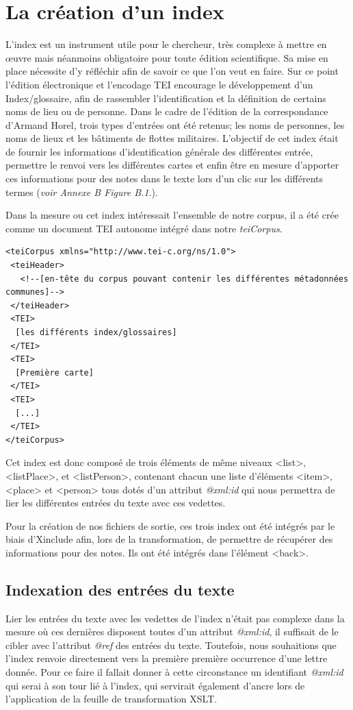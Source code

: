 \documentclass[12pt,a4paper]{book} %
\begin{document}
\section{La création d'un index}

L'index est un instrument utile pour le chercheur, très complexe à mettre en œuvre mais néanmoins obligatoire pour toute édition scientifique. Sa mise en place nécessite d'y réfléchir afin de savoir ce que l'on veut en faire. Sur ce point l'édition électronique et l'encodage TEI encourage le développement d'un Index/glossaire, afin de rassembler l'identification et la définition de certains noms de lieu ou de personne. Dans le cadre de l'édition de la correspondance d'Armand Horel, trois types d'entrées ont été retenus; les noms de personnes, les noms de lieux et les bâtiments de flottes militaires. L'objectif de cet index était de fournir les informations d'identification générale des différentes entrée, permettre le renvoi vers les différentes cartes et enfin être en mesure d'apporter ces informations pour des notes dans le texte lors d'un clic sur les différents termes (\textit{voir Annexe B Figure B.1}.).


Dans la mesure ou cet index intéressait l'ensemble de notre corpus, il a été crée comme un document TEI autonome intégré dans notre \textit{teiCorpus}.
\bigskip

\begin{lstlisting}
<teiCorpus xmlns="http://www.tei-c.org/ns/1.0">
 <teiHeader>
   <!--[en-tête du corpus pouvant contenir les différentes métadonnées communes]-->
 </teiHeader>
 <TEI>
  [les différents index/glossaires]
 </TEI>
 <TEI>
  [Première carte]
 </TEI>
 <TEI>
  [...]
 </TEI>
</teiCorpus>
\end{lstlisting}
\bigskip

Cet index est donc composé de trois éléments de même niveaux <list>, <listPlace>, et <listPerson>, contenant chacun une liste d'éléments <item>, <place> et <person> tous dotés d'un attribut \textit{@xml:id} qui nous permettra de lier les différentes entrées du texte avec ces vedettes.

Pour la création de nos fichiers de sortie, ces trois index ont été intégrés par le biais d'Xinclude afin, lors de la transformation, de permettre de récupérer des informations pour des notes. Ils ont été intégrés dans l'élément <back>.

\subsection{Indexation des entrées du texte}
Lier les entrées du texte avec les vedettes de l'index n'était pas complexe dans la mesure où ces dernières disposent toutes d'un attribut \textit{@xml:id}, il suffisait de le cibler avec  l'attribut \textit{@ref} des entrées du texte. Toutefois, nous souhaitions que l'index renvoie directement vers la première première occurrence d'une lettre donnée. Pour ce faire il fallait donner à cette circonstance  un identifiant \textit{@xml:id} qui serai à son tour lié à l'index, qui servirait également d'ancre lors de l'application de la feuille de transformation XSLT.
\bigskip
\end{document}
